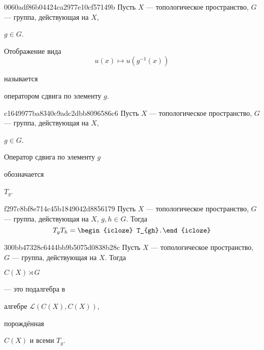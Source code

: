 \begin{note}{0060adf86b04424ca2977e10cf57149b}
    Пусть \({ X }\) --- топологическое пространство, \({ G }\) --- группа, действующая на \({ X }\),\: \begin{icloze}{3}\({ g \in G }\).\end{icloze}
    \begin{icloze}{2}
        Отображение вида
        \[
            u(x) \mapsto u(g^{-1}(x))
        \]
    \end{icloze}
    называется \begin{icloze}{1}оператором сдвига по элементу \({ g }\).\end{icloze}
\end{note}

\begin{note}{c1649977ba8340c9adc2dbb8096586c6}
    Пусть \({ X }\) --- топологическое пространство, \({ G }\) --- группа, действующая на \({ X }\),\: \begin{icloze}{3}\({ g \in G }\).\end{icloze}
    \begin{icloze}{2}Оператор сдвига по элементу \({ g }\)\end{icloze} обозначается \begin{icloze}{1}\({ T_{g} }\).\end{icloze}
\end{note}

\begin{note}{f297c8bf8e714c45b1849042d8856179}
    Пусть \({ X }\) --- топологическое пространство, \({ G }\) --- группа, действующая на \({ X }\),\: \({ g, h \in G }\).
    Тогда
    \[
        T_{g}T_{h} = \begin{icloze}{1}T_{gh}.\end{icloze}
    \]
\end{note}

\begin{note}{300bb47328c6444bb9b5075d0838b28c}
    Пусть \({ X }\) --- топологическое пространство, \({ G }\) --- группа, действующая на \({ X }\).
    Тогда \begin{icloze}{3}\({ C(X) \rtimes G }\)\end{icloze} --- это подалгебра в \begin{icloze}{2}алгебре \({ \mathcal L(C(X), C(X)) }\),\end{icloze} порождённая \begin{icloze}{1}\({ C(X) }\) и всеми \({ T_{g} }\).\end{icloze}
\end{note}

